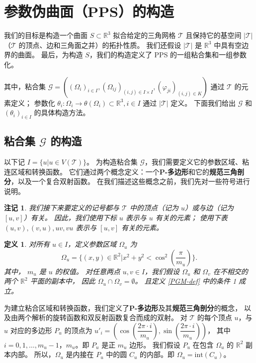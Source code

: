 \documentclass{ctexart}
\newtheorem{Def}{定义}
\newtheorem{Rmk}{注记}
\begin{document}
\section{参数伪曲面（PPS）的构造}
	我们的目标是构造一个曲面 $S\subset \mathbb{R}^3$ 拟合给定的三角网格 $\mathcal{T}$
	且保持它的基空间 $|\mathcal{T}|$ （$\mathcal{T}$ 的顶点、边和三角面之并）的拓扑性质。
	我们还假设 $|\mathcal{T}|$ 是 $\mathbb{R}^3$ 中具有空边界的曲面。
	最后，为构造 $S$，我们的构造定义了 PPS 的一组粘合集和一组参数化。

	其中，粘合集
	$\mathcal{G} = ((\Omega_i)_{i\in I},(\Omega_{ij})_{(i,j)\in I\times I},(\varphi_{ji})_{(i,j)\in K})$
	通过 $\mathcal{T}$ 的元素定义；
	参数化 $\theta_i:\Omega_i\rightarrow \theta(\Omega_i)\subset \mathbb{R}^3,i\in I$
	通过 $|\mathcal{T}|$ 定义。
	下面我们给出 $\mathcal{G}$ 和 $(\theta_i)_{i\in I}$ 的具体构造方法。

	\subsection{粘合集 $\mathcal{G}$ 的构造}
		以下记 $I=\{u|u \in V(\mathcal{T})\}$。
		为构造粘合集 $\mathcal{G}$，我们需要定义它的参数区域、粘连区域和转换函数。
		它们通过两个概念定义：一个\textbf{P-多边形}和它的\textbf{规范三角剖分}，以及一个复合双射函数。
		在我们描述这些概念之前，我们先对一些符号进行说明。

		\begin{Rmk}
			我们接下来要定义的记号都与 $\mathcal{T}$ 中的顶点（记为 $u$）或与边（记为 $[u,v]$）有关。
			因此，我们使用下标 $u$ 表示与 $u$ 有关的元素；
			使用下表 $(u,v),(v,u),uv,vu$ 表示与 $[u,v]$ 有关的元素。
		\end{Rmk}

		\begin{Def}
			对所有 $u\in I$，定义参数区域 $\Omega_u$ 为
			\begin{equation}
				\Omega_u=\{(x,y)\in \mathbb{R}^2|x^2+y^2<\cos^2(\dfrac{\pi}{m_u})\}.
			\end{equation}
			其中， $m_u$ 是 $u$ 的权值。
			对任意两点 $u,v\in I$，我们假设 $\Omega_u$ 和 $\Omega_v$ 在不相交的两个 $\mathbb{R}^2$ 平面的副本中，
			因此 $\Omega_u\cap \Omega_v=\emptyset$。
			且定义 \ref{PGM-def} 中的条件 1 成立。
		\end{Def}
		
		为建立粘合区域和转换函数，我们定义了\textbf{P-多边形}及其\textbf{规范三角剖分}的概念，
		以及由两个解析的旋转函数和双反射函数复合而成的双射。
		对 $\mathcal{T}$ 的每个顶点 $u$，与 $u$ 对应的多边形 $P_u$ 的顶点为
		$u'_i=(\cos(\dfrac{2\pi \cdot i}{m_u}),\sin(\dfrac{2\pi \cdot i}{m_u}))$，
		其中 $i=0,1,\dots,m_u-1$，$m_u$。即 $P_u$ 是正 $m_u$ 边形。
		我们假设 $P_u$ 在包含 $\Omega_u$ 的 $\mathbb{R}^2$ 副本内部。
		所以，$\Omega_u$ 是内接在 $P_u$ 中的圆 $C_u$ 的内部。即 $\Omega_u = \text{int}(C_u)$。
\end{document}
